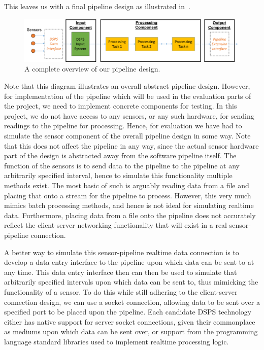 This leaves us with a final pipeline design as illustrated in~.

\begin{figure}[ht]
  \centering
  \includegraphics[width=1\textwidth]{includes/figures/fig_pipeline_whole}
  \caption{A complete overview of our pipeline design.}
  \label{fig:pipeline_whole}
\end{figure}

Note that this diagram illustrates an overall abstract pipeline design. However, for implementation of the pipeline which
will be used in the evaluation parts of the project, we need to implement concrete components for testing. In this project,
we do not have access to any sensors, or any such hardware, for sending readings to the pipeline for processing. Hence, for evaluation
we have had to simulate the sensor component of the overall pipeline design in some way. Note that this does not affect
the pipeline in any way, since the actual sensor hardware part of the design is abstracted away from the software pipeline
itself. The function of the sensors is to send data to the pipeline to the pipeline at any arbitrarily specified interval,
hence to simulate this functionality multiple methods exist. The most basic of such is arguably reading data from a file
and placing that onto a stream for the pipeline to process. However, this very much mimics batch processing methods, and
hence is not ideal for simulating realtime data. Furthermore, placing data from a file onto the pipeline does not accurately
reflect the client-server networking functionality that will exist in a real sensor-pipeline connection.

A better way to simulate this sensor-pipeline realtime data connection is to develop a data entry interface to the pipeline upon which data can be sent to
at any time. This data entry interface then can then be used to simulate that arbitrarily specified intervals upon which data can be sent
to, thus mimicking the functionality of a sensor. To do this while still adhering to the client-server connection design,
we can use a socket connection, allowing data to be sent over a specified port to be placed upon the pipeline. Each
candidate DSPS technology either has native support for server socket connections, given their commonplace as mediums upon
which data can be sent over, or support from the programming language standard libraries used to implement realtime processing logic.

